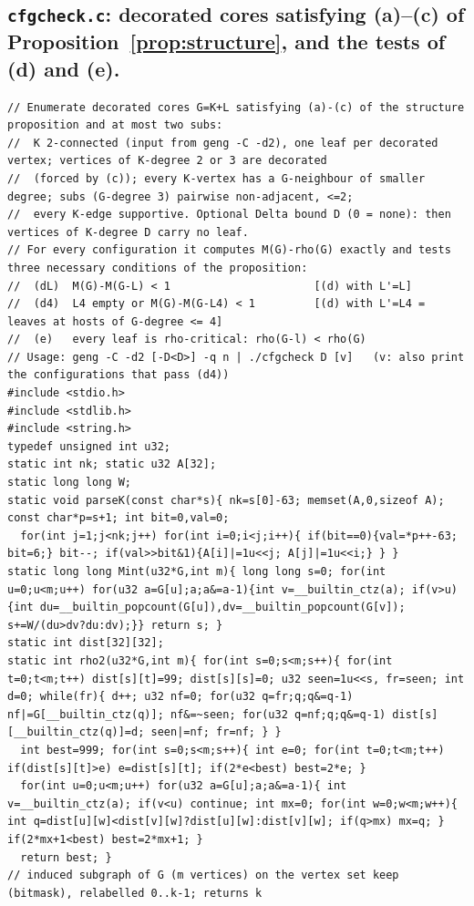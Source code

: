 \documentclass[11pt]{amsart}
\theoremstyle{definition}
\begin{document}
\subsection*{\texttt{cfgcheck.c}: decorated cores satisfying (a)--(c) of Proposition~\ref{prop:structure}, and the tests of (d) and (e).}
\begin{lstlisting}
// Enumerate decorated cores G=K+L satisfying (a)-(c) of the structure proposition and at most two subs:
//  K 2-connected (input from geng -C -d2), one leaf per decorated vertex; vertices of K-degree 2 or 3 are decorated
//  (forced by (c)); every K-vertex has a G-neighbour of smaller degree; subs (G-degree 3) pairwise non-adjacent, <=2;
//  every K-edge supportive. Optional Delta bound D (0 = none): then vertices of K-degree D carry no leaf.
// For every configuration it computes M(G)-rho(G) exactly and tests three necessary conditions of the proposition:
//  (dL)  M(G)-M(G-L) < 1                      [(d) with L'=L]
//  (d4)  L4 empty or M(G)-M(G-L4) < 1         [(d) with L'=L4 = leaves at hosts of G-degree <= 4]
//  (e)   every leaf is rho-critical: rho(G-l) < rho(G)
// Usage: geng -C -d2 [-D<D>] -q n | ./cfgcheck D [v]   (v: also print the configurations that pass (d4))
#include <stdio.h>
#include <stdlib.h>
#include <string.h>
typedef unsigned int u32;
static int nk; static u32 A[32];
static long long W;
static void parseK(const char*s){ nk=s[0]-63; memset(A,0,sizeof A); const char*p=s+1; int bit=0,val=0;
  for(int j=1;j<nk;j++) for(int i=0;i<j;i++){ if(bit==0){val=*p++-63; bit=6;} bit--; if(val>>bit&1){A[i]|=1u<<j; A[j]|=1u<<i;} } }
static long long Mint(u32*G,int m){ long long s=0; for(int u=0;u<m;u++) for(u32 a=G[u];a;a&=a-1){int v=__builtin_ctz(a); if(v>u){int du=__builtin_popcount(G[u]),dv=__builtin_popcount(G[v]); s+=W/(du>dv?du:dv);}} return s; }
static int dist[32][32];
static int rho2(u32*G,int m){ for(int s=0;s<m;s++){ for(int t=0;t<m;t++) dist[s][t]=99; dist[s][s]=0; u32 seen=1u<<s, fr=seen; int d=0; while(fr){ d++; u32 nf=0; for(u32 q=fr;q;q&=q-1) nf|=G[__builtin_ctz(q)]; nf&=~seen; for(u32 q=nf;q;q&=q-1) dist[s][__builtin_ctz(q)]=d; seen|=nf; fr=nf; } }
  int best=999; for(int s=0;s<m;s++){ int e=0; for(int t=0;t<m;t++) if(dist[s][t]>e) e=dist[s][t]; if(2*e<best) best=2*e; }
  for(int u=0;u<m;u++) for(u32 a=G[u];a;a&=a-1){ int v=__builtin_ctz(a); if(v<u) continue; int mx=0; for(int w=0;w<m;w++){ int q=dist[u][w]<dist[v][w]?dist[u][w]:dist[v][w]; if(q>mx) mx=q; } if(2*mx+1<best) best=2*mx+1; }
  return best; }
// induced subgraph of G (m vertices) on the vertex set keep (bitmask), relabelled 0..k-1; returns k

\end{lstlisting}
\end{document}
